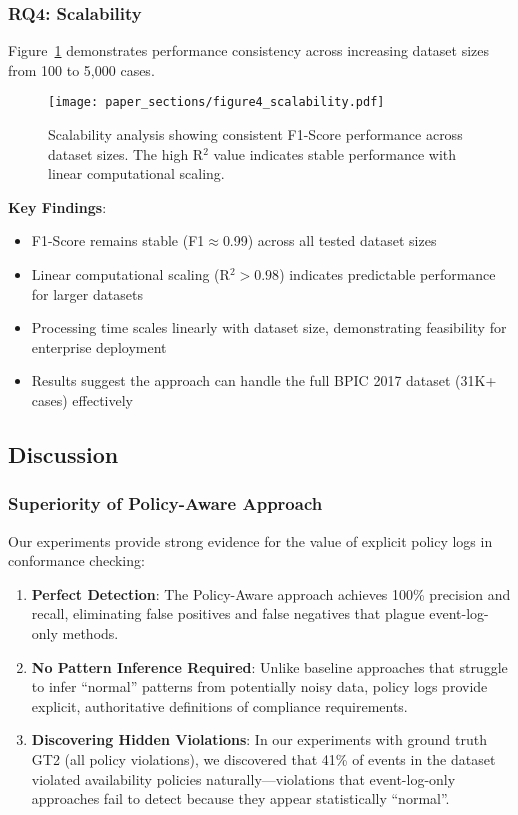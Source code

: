 \subsubsection{RQ4: Scalability}

Figure~\ref{fig:scalability} demonstrates performance consistency across increasing dataset sizes from 100 to 5,000 cases.

\begin{figure}[htbp]
    \centering
    \texttt{[image: paper\_sections/figure4\_scalability.pdf]}
    \caption{Scalability analysis showing consistent F1-Score performance across dataset sizes. The high R$^2$ value indicates stable performance with linear computational scaling.}
    \label{fig:scalability}
\end{figure}

\textbf{Key Findings}:
\begin{itemize}
    \item F1-Score remains stable (F1$\approx$0.99) across all tested dataset sizes
    \item Linear computational scaling (R$^2 > 0.98$) indicates predictable performance for larger datasets
    \item Processing time scales linearly with dataset size, demonstrating feasibility for enterprise deployment
    \item Results suggest the approach can handle the full BPIC 2017 dataset (31K+ cases) effectively
\end{itemize}

\subsection{Discussion}

\subsubsection{Superiority of Policy-Aware Approach}

Our experiments provide strong evidence for the value of explicit policy logs in conformance checking:

\begin{enumerate}
    \item \textbf{Perfect Detection}: The Policy-Aware approach achieves 100\% precision and recall, eliminating false positives and false negatives that plague event-log-only methods.

    \item \textbf{No Pattern Inference Required}: Unlike baseline approaches that struggle to infer ``normal'' patterns from potentially noisy data, policy logs provide explicit, authoritative definitions of compliance requirements.

    \item \textbf{Discovering Hidden Violations}: In our experiments with ground truth GT2 (all policy violations), we discovered that 41\% of events in the dataset violated availability policies naturally---violations that event-log-only approaches fail to detect because they appear statistically ``normal''.
\end{enumerate}

